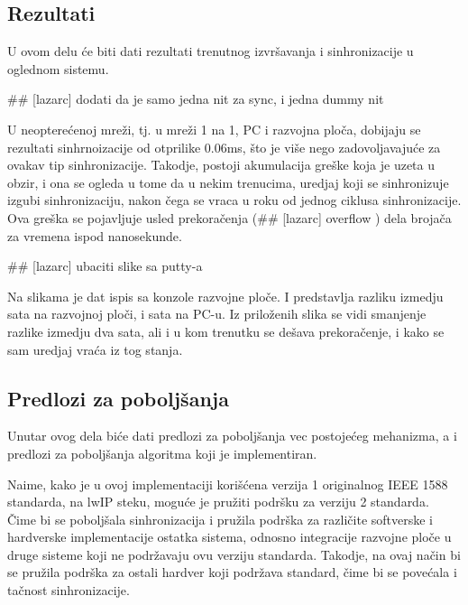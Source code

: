 \documentclass[a4paper,12pt, master]{etf}
\begin{document}
	\subsection{Rezultati}

	U ovom delu \'{c}e biti dati rezultati trenutnog izvr\v{s}avanja i 
	sinhronizacije u oglednom sistemu.

	\#\# [lazarc] dodati da je samo jedna nit za sync, i jedna dummy nit

	U neoptere\'{c}enoj mre\v{z}i, tj\@. u mre\v{z}i 1 na 1, PC i razvojna 
	plo\v{c}a, dobijaju se rezultati sinhrnoizacije od otprilike 0.06ms, 
	\v{s}to je vi\v{s}e nego zadovoljavaju\'{c}e za ovakav tip sinhronizacije. 
	Takodje, postoji akumulacija gre\v{s}ke koja je uzeta u obzir, i ona se 
	ogleda u tome da u nekim trenucima, uredjaj koji se	sinhronizuje izgubi 
	sinhronizaciju, nakon \v{c}ega se vraca u roku od jednog ciklusa 
	sinhronizacije. Ova gre\v{s}ka se pojavljuje usled prekora\v{c}enja 
	(\#\# [lazarc] overflow ) dela broja\v{c}a za vremena ispod nanosekunde.

	\#\# [lazarc] ubaciti slike sa putty-a
		
	Na slikama je dat ispis sa konzole razvojne plo\v{c}e. I predstavlja 
	razliku izmedju sata na razvojnoj plo\v{c}i, i sata na PC-u. Iz 
	prilo\v{z}enih slika se vidi smanjenje razlike izmedju dva sata, ali i u 
	kom trenutku se de\v{s}ava prekora\v{c}enje, i kako se sam uredjaj 
	vra\'{c}a iz tog stanja.

	\subsection{Predlozi za pobolj\v{s}anja}

	Unutar ovog dela bi\'{c}e dati predlozi za pobolj\v{s}anja vec 
	postoje\'{c}eg mehanizma, a i predlozi za pobolj\v{s}anja algoritma koji je 
	implementiran.

	Naime, kako je u ovoj implementaciji kori\v{s}\'{c}ena verzija 1 
	originalnog IEEE 1588 standarda, na lwIP steku, mogu\'{c}e je pru\v{z}iti 
	podr\v{s}ku za verziju 2 standarda. \v{C}ime bi se pobolj\v{s}ala 
	sinhronizacija i pru\v{z}ila podr\v{s}ka za razli\v{c}ite softverske i 
	hardverske implementacije ostatka sistema, odnosno integracije razvojne 
	plo\v{c}e u druge sisteme koji ne podr\v{z}avaju ovu verziju standarda. 
	Takodje, na ovaj na\v{c}in bi se pru\v{z}ila podr\v{s}ka za ostali hardver 
	koji podr\v{z}ava standard, \v{c}ime bi se pove\'{c}ala i ta\v{c}nost 
	sinhronizacije.
\end{document}
